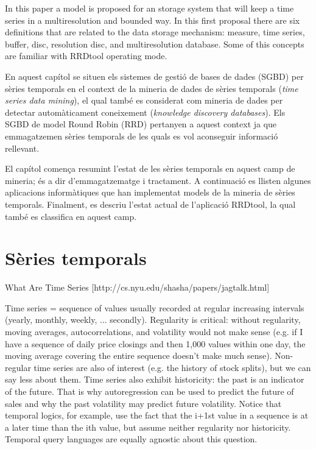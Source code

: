 In this paper
a model is proposed for an storage system that will keep a time series
in a multiresolution and bounded way.  In this first proposal there
are six definitions that are related to the data storage mechanism:
measure, time series, buffer, disc, resolution disc, and multiresolution
database. Some of this concepts are familiar with RRDtool
operating mode.

En aquest capítol se situen els sistemes de gestió de bases de dades (SGBD) per sèries temporals en el context de la mineria de dades de sèries temporals (\emph{time series data mining}), el qual també es considerat com mineria de dades per  detectar automàticament coneixement (\emph{knowledge discovery databases}). Els SGBD de model Round Robin (RRD) pertanyen a aquest context ja que  emmagatzemen sèries temporals  de les quals es vol aconseguir informació rellevant.

El capítol comença resumint l'estat de les sèries temporals en aquest camp de mineria; és a dir d'emmagatzematge i tractament. A continuació es llisten algunes aplicacions informàtiques que han implementat models de la mineria de sèries temporals. Finalment, es descriu l'estat actual de l'aplicació RRDtool, la qual també es classifica en aquest camp.





\section{Sèries temporals}

What Are Time Series [http://cs.nyu.edu/shasha/papers/jagtalk.html]

Time series = sequence of values usually recorded at regular increasing intervals 
(yearly, monthly, weekly, ... secondly). 
Regularity is critical: without regularity, moving averages, autocorrelations, and volatility would not make sense (e.g. if I have a sequence of daily price closings and then 1,000 values within one day, the moving average covering the entire sequence doesn't make much sense). 
Non-regular time series are also of interest (e.g. the history of stock splits), but we can say less about them.
Time series also exhibit historicity: the past is an indicator of the future. That is why autoregression can be used to predict the future of sales and why the past volatility may predict future volatility.
Notice that temporal logics, for example, use the fact that the i+1st value in a sequence is at a later time than the ith value, but assume neither regularity nor historicity. Temporal query languages are equally agnostic about this question.




